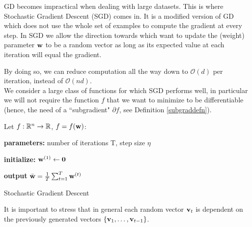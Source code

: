 \documentclass{article}
\begin{document}
GD becomes impractical when dealing with large datasets. This is where Stochastic Gradient Descent (SGD) comes in. It is a modified version of GD which does not use the whole set of examples to compute the gradient at every step. 
In SGD we allow the direction towards which want to update the (weight) parameter ${\bf w}$ to be a random vector as long as its expected value at each iteration will equal the gradient.%

By doing so, we can reduce computation all the way down to $\mathcal O(d)$ per iteration, instead of $\mathcal O(nd)$. \\



We consider a large class of functions for which SGD performs well, in particular we will not require the function $f$ that we want to minimize to be differentiable (hence, the need of a ``subgradient" $\partial f$, see Definition \ref{subgraddefn}). 

Let $f: \mathbb{R}^n \to \mathbb{R}$, $f =f({\bf w})$:
%
%  
%  
% 
\begin{algorithm}[H]
\SetAlgoLined
\textbf{parameters:} number of iterations T, step size $\eta$ %

\textbf{initialize:} ${\bf w}^{(1)} \gets {\bf 0}$

 
 \textbf{output} $\bar{\bf w} = \frac{1}{T} \sum_{t=1}^T {\bf w}^{(t)}$
 \caption{Stochastic Gradient Descent \label{SGDalgo}}
\end{algorithm}


\begin{note}
It is important to stress that in general each random vector ${\bf v}_t$ is dependent on the previously generated vectors $\{{\bf v}_1, \ldots, {\bf v}_{t-1} \}$.
\end{note}
\end{document}
